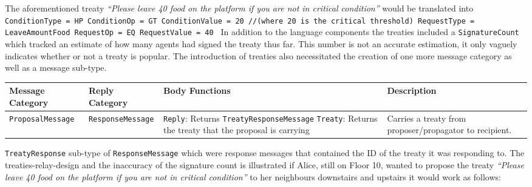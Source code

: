 \vspace{\baselineskip}
The aforementioned treaty \textit{“Please leave 40 food on the platform if you are not in critical condition”} would be translated into \newline
\texttt{ConditionType = HP \newline
        ConditionOp = GT \newline
        ConditionValue = 20 //(where 20 is the critical threshold) \newline
        RequestType = LeaveAmountFood \newline
        RequestOp = EQ \newline
        RequestValue = 40 \newline}
In addition to the language components the treaties included a \texttt{SignatureCount} which tracked an estimate of how many agents had signed the treaty thus far. This number is not an accurate estimation, it only vaguely indicates whether or not a treaty is popular. 
The introduction of treaties also necessitated the creation of one more message category as well as a message sub-type. 
\begin{center}
\begin{tabular}{p{3cm}p{3cm}p{5cm}p{3.5cm}}
 \hline
 \textbf{Message \newline Category} & \textbf{Reply \newline Category} & \textbf{Body Functions} & \textbf{Description} \\ [0.5ex] 
 \hline\hline
 \texttt{ProposalMessage} & \texttt{ResponseMessage} &  
 \texttt{Reply}: Returns \texttt{TreatyResponseMessage} \newline 
 \texttt{Treaty}: Returns the treaty that the proposal is carrying &
 Carries a treaty from proposer/propagator to recipient.\\
 \hline
\end{tabular}
\end{center}
\texttt{TreatyResponse} sub-type of \texttt{ResponseMessage} which were response messages that contained the ID of the treaty it was responding to. \newline
The treaties-relay-design and the inaccuracy of the signature count is illustrated if Alice, still on Floor 10, wanted to propose the treaty \textit{“Please leave 40 food on the platform if you are not in critical condition”} to her neighbours downstairs and upstairs it would work as follows:
